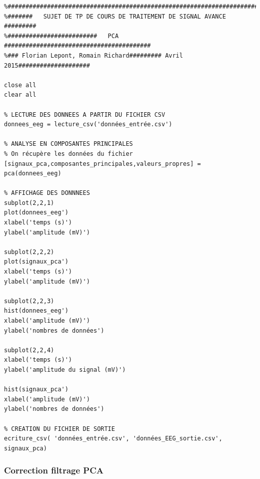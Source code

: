 \begin{verbatim}
%##########################################################################
%#######   SUJET DE TP DE COURS DE TRAITEMENT DE SIGNAL AVANCE    #########
%#########################   PCA  #########################################
%### Florian Lepont, Romain Richard######### Avril 2015####################

close all
clear all

% LECTURE DES DONNEES A PARTIR DU FICHIER CSV
donnees_eeg = lecture_csv('données_entrée.csv')

% ANALYSE EN COMPOSANTES PRINCIPALES
% On récupère les données du fichier
[signaux_pca,composantes_principales,valeurs_propres] = pca(donnees_eeg) 

% AFFICHAGE DES DONNNEES
subplot(2,2,1) 
plot(donnees_eeg')
xlabel('temps (s)')
ylabel('amplitude (mV)')

subplot(2,2,2)
plot(signaux_pca')
xlabel('temps (s)')
ylabel('amplitude (mV)')

subplot(2,2,3)
hist(donnees_eeg')
xlabel('amplitude (mV)')
ylabel('nombres de données')

subplot(2,2,4)
xlabel('temps (s)')
ylabel('amplitude du signal (mV)')

hist(signaux_pca')
xlabel('amplitude (mV)')
ylabel('nombres de données')

% CREATION DU FICHIER DE SORTIE
ecriture_csv( 'données_entrée.csv', 'données_EEG_sortie.csv', signaux_pca)
\end{verbatim}


\newpage
\subsubsection{Correction filtrage PCA}

